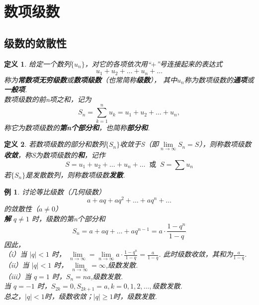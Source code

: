 \documentclass[12pt, UTF8, AutoFakeBold]{ctexart} %
\newtheorem{definition}{定义}[section]
\newtheorem{example}{例}[section]
\begin{document}
\tableofcontents %
\clearpage

\section{数项级数}

\subsection{级数的敛散性}
\begin{definition}
    给定一个数列$\{u_n\}$，对它的各项依次用“$+$”号连接起来的表达式
    \[
        u_1 + u_2 + \dots + u_n + \dots
    \]
    称为\textbf{\kaishu 常数项无穷级数}或\textbf{\kaishu 数项级数}（也常简称\textbf{\kaishu 级数}），
    其中$u_n$称为数项级数的\textbf{\kaishu 通项}或\textbf{\kaishu 一般项}.\\
    数项级数的前n项之和，记为
    \[
        S_n = \sum_{k=1}^{n}u_k = u_1 + u_2 + \dots + u_n,
    \]
    称它为数项级数的\textbf{\kaishu 第n个部分和}，也简称\textbf{\kaishu 部分和}.
\end{definition}

\begin{definition}
    若数项级数的部分和数列$\{S_n\}$收敛于S（即$\lim\limits_{n \to \infty}S_n = S$），则称数项级数\textbf{\kaishu 收敛}，称S为数项级数的\textbf{\kaishu 和}，记作
    \[
        S = u_1 + u_2 + \dots + u_n + \dots \;\; \text{或} \;\; S = \sum u_n
    \]
    若$\{S_n\}$是发散数列，则称数项级数\textbf{\kaishu 发散}.
\end{definition}

\begin{example}
    讨论等比级数（几何级数）
    \[
        a + aq + aq^2 + \dots + aq^n + \dots
    \]
    的敛散性（$a \neq 0$）\\
    \textbf{解} $q \neq 1$ 时，级数的第n个部分和
    \[
        S_n = a + aq + \dots + aq^{n-1} = a \cdot \frac{1 - q^n}{1 - q} 
    \]
    因此，\\
    \indent （i）当 $\lvert q \rvert < 1$ 时，
    $\lim\limits_{n \to \infty} = \lim\limits_{n \to \infty} a \cdot \frac{1 - q^n}{1 - q} = \frac{a}{1 - q}$. 
    此时级数收敛，其和为$\frac{a}{1 - q}$.\\
    \indent （ii）当 $\left\lvert q \right\rvert < 1$ 时，
    $\lim\limits_{n \to \infty} = \infty$,级数发散.\\
    \indent （iii）当 $q = 1$ 时，$S_n = na$,级数发散.\\
    \indent 当 $q = -1$ 时，$S_{2k} = 0, S_{2k+1} = a, k = 0, 1, 2, \dots,$级数发散.\\
    \indent 总之，$\lvert q \rvert < 1$时，级数收敛；$\lvert q \rvert \geqslant 1$时，级数发散.
\end{example}
\end{document}

